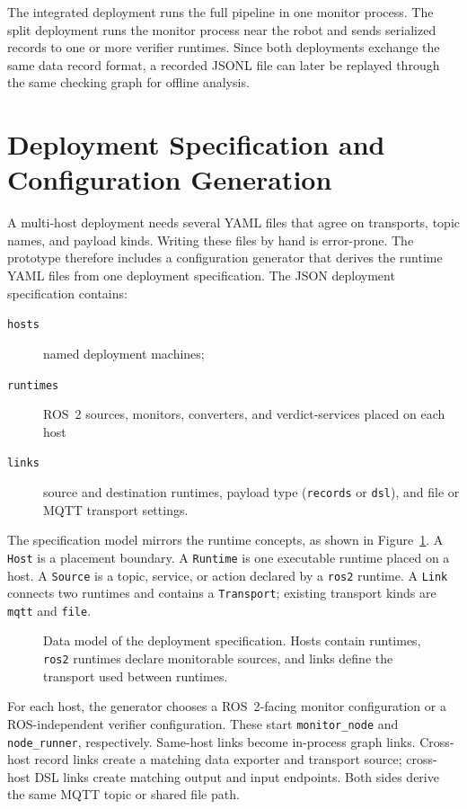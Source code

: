 The integrated deployment runs the full pipeline in one monitor process. The
split deployment runs the monitor process near the robot and sends serialized
records to one or more verifier runtimes. Since both deployments exchange the
same data record format, a recorded JSONL file can later be replayed through
the same checking graph for offline analysis.

\section{Deployment Specification and Configuration Generation}
\label{sec:impl-config-gen}

A multi-host deployment needs several YAML files that agree on transports,
topic names, and payload kinds. Writing these files by hand is error-prone. The prototype therefore includes a configuration generator that derives
the runtime YAML files from one deployment specification. The JSON deployment
specification contains:

\begin{description}
  \item[\texttt{hosts}] named deployment machines;
  \item[\texttt{runtimes}] ROS~2 sources, monitors, converters, and
  verdict-services placed on each host
  \item[\texttt{links}] source and destination runtimes, payload type
  (\texttt{records} or \texttt{dsl}), and file or MQTT transport settings.
\end{description}

The specification model mirrors the runtime concepts, as
shown in Figure~\ref{fig:config-generation-model}. A \texttt{Host} is a
placement boundary. A \texttt{Runtime} is one executable runtime placed on a
host. A \texttt{Source} is a topic, service, or action declared by a
\texttt{ros2} runtime. A \texttt{Link} connects two runtimes and contains a
\texttt{Transport}; existing transport kinds are \texttt{mqtt} and
\texttt{file}.

\begin{figure}[htbp]
    \centering
    \resizebox{\textwidth}{!}{}
    \caption{Data model of the deployment specification. Hosts contain
    runtimes, \texttt{ros2} runtimes declare monitorable sources, and links
    define the transport used between runtimes.}
    \label{fig:config-generation-model}
\end{figure}

For each host, the generator chooses a ROS~2-facing monitor configuration or a
ROS-independent verifier configuration. These start \texttt{monitor\_node} and
\texttt{node\_runner}, respectively. Same-host
links become in-process graph links. Cross-host record links create a matching
data exporter and transport source; cross-host DSL links create matching output
and input endpoints. Both sides derive the same MQTT topic or shared file path.

